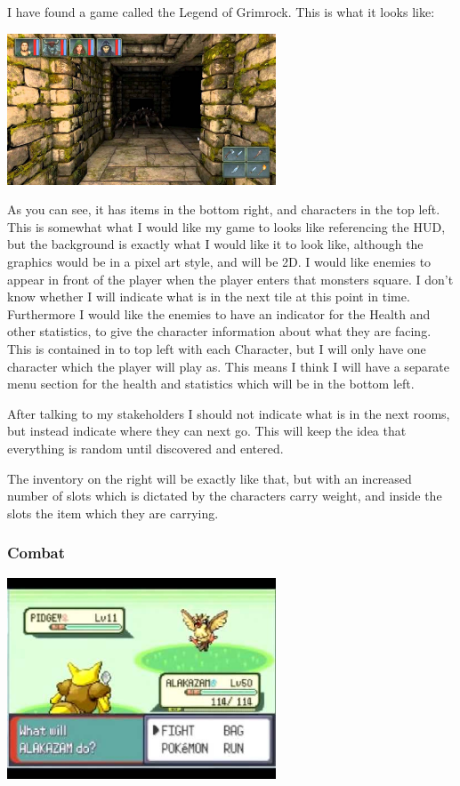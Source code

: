 \documentclass[12pt]{article}
\begin{document}
I have found a game called the Legend of Grimrock. This is what it looks like:

\includegraphics[width = 0.6\textwidth]{Grimlock_Image}

As you can see, it has items in the bottom right, and characters in the top left. This is somewhat what I would like my game to looks like referencing the HUD, but the background is exactly what I would like it to look like, although the graphics would be in a pixel art style, and will be 2D. I would like enemies to appear in front of the player when the player enters that monsters square. I don't know whether I will indicate what is in the next tile at this point in time. Furthermore I would like the enemies to have an indicator for the Health and other statistics, to give the character information about what they are facing. This is contained in to top left with each Character, but I will only have one character which the player will play as. This means I think I will have a separate menu section for the health and statistics which will be in the bottom left.

After talking to my stakeholders I should not indicate what is in the next rooms, but instead indicate where they can next go. This will keep the idea that everything is random until discovered and entered.

The inventory on the right will be exactly like that, but with an increased number of slots which is dictated by the characters carry weight, and inside the slots the item which they are carrying.


			\subsubsection{Combat}

\includegraphics[width = 0.6\textwidth]{Pokemon_Image}
\end{document}
